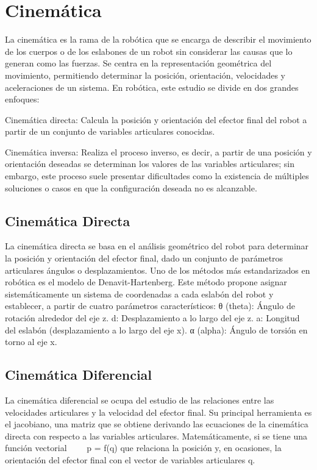 \section{Cinemática} \label{sec:cinematica}

La cinemática es la rama de la robótica que se encarga de describir el movimiento de los cuerpos o de los eslabones de un robot sin considerar las causas que lo generan como las fuerzas. Se centra en la representación geométrica del movimiento, permitiendo determinar la posición, orientación, velocidades y aceleraciones de un sistema. En robótica, este estudio se divide en dos grandes enfoques:

Cinemática directa: Calcula la posición y orientación del efector final del robot a partir de un conjunto de variables articulares conocidas.

Cinemática inversa: Realiza el proceso inverso, es decir, a partir de una posición y orientación deseadas se determinan los valores de las variables articulares; sin embargo, este proceso suele presentar dificultades como la existencia de múltiples soluciones o casos en que la configuración deseada no es alcanzable.


\subsection{Cinemática Directa}
La cinemática directa se basa en el análisis geométrico del robot para determinar la posición y orientación del efector final, dado un conjunto de parámetros articulares ángulos o desplazamientos. Uno de los métodos más estandarizados en robótica es el modelo de Denavit-Hartenberg. Este método propone asignar sistemáticamente un sistema de coordenadas a cada eslabón del robot y establecer, a partir de cuatro parámetros característicos:
θ (theta): Ángulo de rotación alrededor del eje z.
d: Desplazamiento a lo largo del eje z.
a: Longitud del eslabón (desplazamiento a lo largo del eje x).
α (alpha): Ángulo de torsión en torno al eje x.

\subsection{Cinemática Diferencial}
La cinemática diferencial se ocupa del estudio de las relaciones entre las velocidades articulares y la velocidad del efector final. Su principal herramienta es el jacobiano, una matriz que se obtiene derivando las ecuaciones de la cinemática directa con respecto a las variables articulares. Matemáticamente, si se tiene una función vectorial   p = f(q) que relaciona la posición y, en ocasiones, la orientación del efector final con el vector de variables articulares q.

